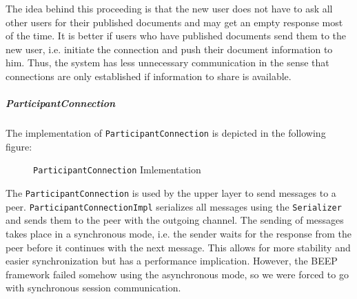 The idea behind this proceeding is that the new user does not have to ask all other users for their published documents and may get an empty response most of the time. It is better if users who have published documents send them to the new user, i.e. initiate the connection and push their document information to him. Thus, the system has less unnecessary communication in the sense that connections are only established if information to share is available.

\subparagraph{ParticipantConnection}
The implementation of \texttt{ParticipantConnection} is depicted in the following figure:

\begin{figure}[H]
 \centering
 \caption{\texttt{ParticipantConnection} Imlementation}
 \label{fig:network.protocol.participantconnectionimpl.uml}
\end{figure}

The \texttt{ParticipantConnection} is used by the upper layer to send messages to a peer. \texttt{Participant\-Connection\-Impl} serializes all messages using the \texttt{Serializer} and sends them to the peer with the outgoing channel. The sending of messages takes place in a synchronous mode, i.e. the sender waits for the response from the peer before it continues with the next message. This allows for more stability and easier synchronization but has a performance implication. However, the BEEP framework failed somehow using the asynchronous mode, so we were forced to go with synchronous session communication.

